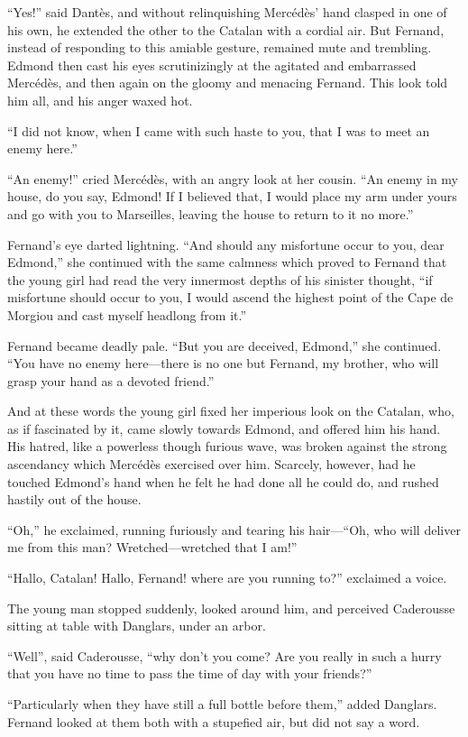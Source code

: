 “Yes!” said Dantès, and without relinquishing Mercédès’ hand clasped in
one of his own, he extended the other to the Catalan with a cordial
air. But Fernand, instead of responding to this amiable gesture,
remained mute and trembling. Edmond then cast his eyes scrutinizingly
at the agitated and embarrassed Mercédès, and then again on the gloomy
and menacing Fernand. This look told him all, and his anger waxed hot.

“I did not know, when I came with such haste to you, that I was to meet
an enemy here.”

“An enemy!” cried Mercédès, with an angry look at her cousin. “An enemy
in my house, do you say, Edmond! If I believed that, I would place my
arm under yours and go with you to Marseilles, leaving the house to
return to it no more.”

Fernand’s eye darted lightning. “And should any misfortune occur to
you, dear Edmond,” she continued with the same calmness which proved to
Fernand that the young girl had read the very innermost depths of his
sinister thought, “if misfortune should occur to you, I would ascend
the highest point of the Cape de Morgiou and cast myself headlong from
it.”

Fernand became deadly pale. “But you are deceived, Edmond,” she
continued. “You have no enemy here—there is no one but Fernand, my
brother, who will grasp your hand as a devoted friend.”

And at these words the young girl fixed her imperious look on the
Catalan, who, as if fascinated by it, came slowly towards Edmond, and
offered him his hand. His hatred, like a powerless though furious wave,
was broken against the strong ascendancy which Mercédès exercised over
him. Scarcely, however, had he touched Edmond’s hand when he felt he
had done all he could do, and rushed hastily out of the house.

“Oh,” he exclaimed, running furiously and tearing his hair—“Oh, who
will deliver me from this man? Wretched—wretched that I am!”

“Hallo, Catalan! Hallo, Fernand! where are you running to?” exclaimed a
voice.

The young man stopped suddenly, looked around him, and perceived
Caderousse sitting at table with Danglars, under an arbor.

“Well”, said Caderousse, “why don’t you come? Are you really in such a
hurry that you have no time to pass the time of day with your friends?”

“Particularly when they have still a full bottle before them,” added
Danglars. Fernand looked at them both with a stupefied air, but did not
say a word.


